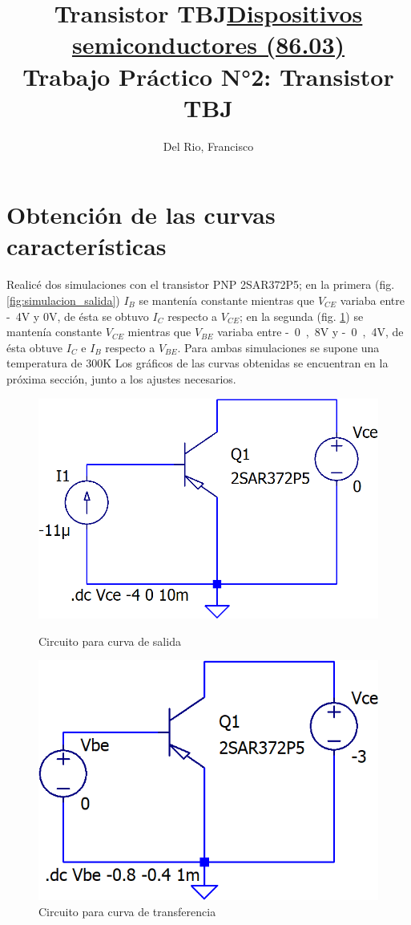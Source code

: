 \documentclass[10pt]{article}
\title{Transistor TBJ}	            %
\author{Del Rio, Francisco}
\date{\vspace{-5ex}}
\begin{document}
\title{\textbf{\underline{Dispositivos semiconductores (86.03)} \\
Trabajo Práctico N°2: Transistor TBJ}}
\maketitle


\section{Obtención de las curvas características}
\quad Realicé dos simulaciones con el transistor PNP 2SAR372P5; en la primera (fig. \ref{fig:simulacion_salida}) $I_B$ se mantenía constante mientras que $V_{CE}$ variaba entre \si{-4}{V} y \si{0}{V}, de ésta se obtuvo $I_C$ respecto a $V_{CE}$; en la segunda (fig. \ref{fig:simulacion_transferencia}) se mantenía constante $V_{CE}$ mientras que $V_{BE}$ variaba entre \si{-0,8}{V} y \si{-0,4}{V}, de ésta obtuve $I_C$ e $I_B$ respecto a $V_{BE}$. Para ambas simulaciones se supone una temperatura de 300K Los gráficos de las curvas obtenidas se encuentran en la próxima sección, junto a los ajustes necesarios.
\begin{figure}[ht!]
\begin{minipage}{.5\textwidth}
\centering
\includegraphics[width=0.6\linewidth]{resources/simulacion_salida.png}
\caption{Circuito para curva de salida}
\label{fig:simulacion_salida}
\end{minipage}
\begin{minipage}{.5\textwidth}
\centering
\includegraphics[width=0.6\linewidth]{resources/simulacion_transferencia.png}
\caption{Circuito para curva de transferencia}
\label{fig:simulacion_transferencia}
\end{minipage}
\end{figure}
\end{document}
